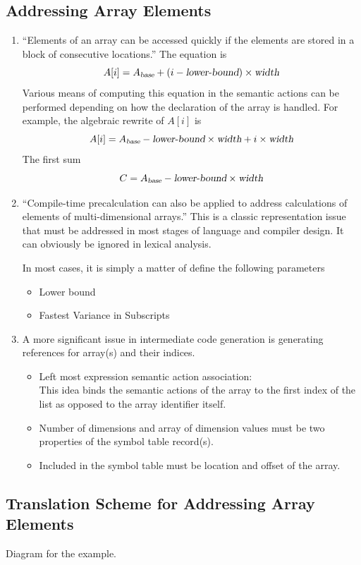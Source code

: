 \documentclass[11pt]{article}
\begin{document}
\subsection  {Addressing Array Elements}
\begin{enumerate}
\item ``Elements of an array can be accessed quickly if the elements are stored in a block of consecutive locations.''  The equation is 
\[ A [i] = A_{\textsl{base}} + ( i - {\textsl{lower-bound} } ) \times \textsl{width} \]
Various means of computing this equation in the semantic actions can be performed depending on how the declaration of the array is handled.   For example, the algebraic rewrite of $A[i]$ is 
\[ A[i] = A_{\textsl{base}} - \textsl{lower-bound} \times \textsl {width} + i \times \textsl{width} \]
The first sum 
\[ C  = A_{\textsl{base}} - \textsl{lower-bound} \times \textsl {width}  \]  
\item ``Compile-time precalculation can also be applied to address calculations of elements of multi-dimensional arrays.''    This is a classic representation issue that must be addressed in most stages of language and compiler design.    It can obviously be ignored in lexical analysis.   

In most cases, it is simply a matter of define the following parameters
\begin{itemize}
\item Lower bound 
\item Fastest Variance in Subscripts
\end{itemize}
\item A more significant issue in intermediate code generation is generating references for array(s) and their indices.  
\begin{itemize}
\item Left most expression semantic action association:  \\
This idea binds the semantic actions of the array to the first index of the list as opposed to the array identifier itself.  
\item Number of dimensions and array of dimension values must be two properties of the symbol table record(s).  
\item Included in the symbol table must be location and offset of the array.  
\end{itemize}

\end{enumerate}

\subsection {Translation Scheme for Addressing Array Elements}
Diagram for the example.  
\end{document}
